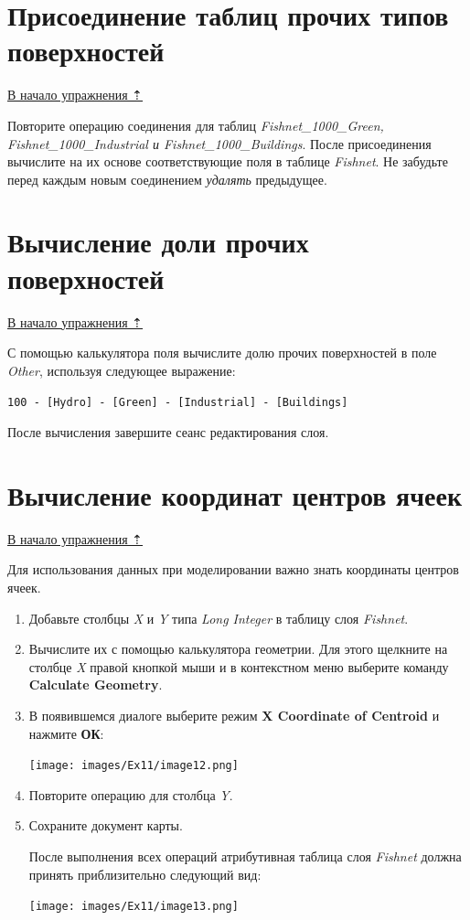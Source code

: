 \documentclass[12pt,]{book}
\begin{document}
\hypertarget{land-cover-hydro-other-tables}{%
\section{Присоединение таблиц прочих типов поверхностей}\label{land-cover-hydro-other-tables}}

\protect\hyperlink{land-cover-hydro}{В начало упражнения ⇡}

Повторите операцию соединения для таблиц \emph{Fishnet\_1000\_Green, Fishnet\_1000\_Industrial и Fishnet\_1000\_Buildings}. После присоединения вычислите на их основе соответствующие поля в таблице \emph{Fishnet}. Не забудьте перед каждым новым соединением \emph{удалять} предыдущее.

\hypertarget{land-cover-hydro-other-ratios}{%
\section{Вычисление доли прочих поверхностей}\label{land-cover-hydro-other-ratios}}

\protect\hyperlink{land-cover-hydro}{В начало упражнения ⇡}

С помощью калькулятора поля вычислите долю прочих поверхностей в поле \emph{Other}, используя следующее выражение:

\texttt{100\ -\ {[}Hydro{]}\ -\ {[}Green{]}\ -\ {[}Industrial{]}\ -\ {[}Buildings{]}}

После вычисления завершите сеанс редактирования слоя.

\hypertarget{land-cover-hydro-other-centers}{%
\section{Вычисление координат центров ячеек}\label{land-cover-hydro-other-centers}}

\protect\hyperlink{land-cover-hydro}{В начало упражнения ⇡}

Для использования данных при моделировании важно знать координаты центров ячеек.

\begin{enumerate}
\def\labelenumi{\arabic{enumi}.}
\item
  Добавьте столбцы \emph{X} и \emph{Y} типа \emph{Long Integer} в таблицу слоя \emph{Fishnet}.
\item
  Вычислите их с помощью калькулятора геометрии. Для этого щелкните на столбце \emph{X} правой кнопкой мыши и в контекстном меню выберите команду \textbf{Calculate Geometry}.
\item
  В появившемся диалоге выберите режим \textbf{X Coordinate of Centroid} и нажмите \textbf{ОК}:

  \texttt{[image: images/Ex11/image12.png]}
\item
  Повторите операцию для столбца \emph{Y}.
\item
  Сохраните документ карты.

  После выполнения всех операций атрибутивная таблица слоя \emph{Fishnet} должна принять приблизительно следующий вид:

  \texttt{[image: images/Ex11/image13.png]}
\end{enumerate}
\end{document}

